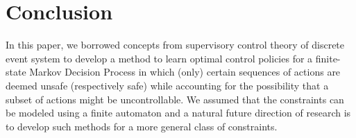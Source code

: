 \documentclass[letterpaper, 10 pt, conference]{ieeeconf}
\begin{document}
\section{Conclusion}\label{concl}
In this paper, we borrowed concepts from supervisory control theory of discrete event system to develop a method to learn optimal control policies for a finite-state Markov Decision Process in which (only) certain sequences of actions are deemed unsafe (respectively safe) while accounting for the possibility that a subset of actions might be uncontrollable. We assumed that the constraints can be modeled using a finite automaton and a natural future direction of research is to develop such methods for a more general class of constraints. 








%

\end{document}
